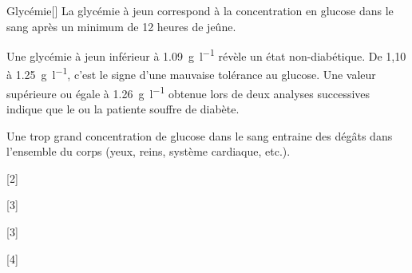 \begin{doc}{Glycémie}[\label{doc:glycemie}]
  La glycémie à jeun correspond à la concentration en glucose dans le sang après un minimum de 12 heures de jeûne.

  Une glycémie à jeun inférieur à \qty{1,09}{\g\per\litre} révèle un état non-diabétique.
  De 1,10 à \qty{1,25}{\g\per\litre}, c'est le signe d'une mauvaise tolérance au glucose.
  Une valeur supérieure ou égale à \qty{1,26}{\g\per\litre} obtenue lors de deux analyses successives indique que le ou la patiente souffre de diabète.

  Une trop grand concentration de glucose dans le sang entraine des dégâts dans l'ensemble du corps (yeux, reins, système cardiaque, etc.).
\end{doc}

[2]

[3]

[3]

[4]

